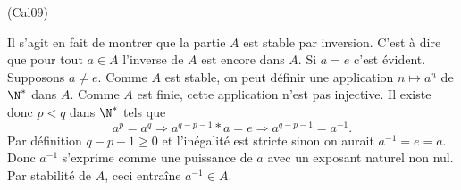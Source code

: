 \begin{tiny}(Cal09)\end{tiny} Il s'agit en fait de montrer que la partie $A$ est stable par inversion. C'est à dire que pour tout $a\in A$ l'inverse de $A$ est encore dans $A$.\newline
Si $a=e$ c'est évident. Supposons $a\neq e$. Comme $A$ est stable, on peut définir une application $n\mapsto a^n$ de $\N^{*}$ dans $A$. Comme $A$ est finie, cette application n'est pas injective. Il existe donc $p<q$ dans $\N^*$ tels que
\[
 a^p = a^q \Rightarrow a^{q-p-1}*a = e \Rightarrow a^{q-p-1} = a^{-1}.
\]
Par définition $q-p-1\geq 0$ et l'inégalité est stricte sinon on aurait $a^{-1}=e =a$. Donc $a^{-1}$ s'exprime comme une puissance de $a$ avec un exposant naturel non nul. Par stabilité de $A$, ceci entraîne $a^{-1}\in A$.
